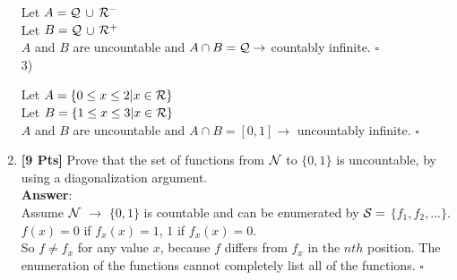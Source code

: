 \documentclass[11pt]{article}
\begin{document}
\begin{enumerate}
Let $A = \cal Q$ $\cup$ $\cal R^-$\\
Let $B = \cal Q$ $\cup$ $\cal R^+$\\

$A$ and $B$ are uncountable and $A \cap B = \cal Q \rightarrow$ countably infinite. $\square$ \\

3)

Let $A = \{ 0 \leq x \leq 2 | x \in \cal R \}$\\
Let $B = \{ 1 \leq x \leq 3 | x \in \cal R \}$\\

$A$ and $B$ are uncountable and $A \cap B = [0,1] \rightarrow$ uncountably infinite. $\square$ \\
 
\clearpage
 
\item {\bf [9 Pts]} Prove that the set of functions from $\cal N$ to $\{0,1\}$ is
  uncountable, by using a diagonalization argument.\\
  \textbf{Answer}:\\
  
  Assume $\cal N$ $\rightarrow$ $\{0,1\}$ is countable and can be enumerated by $\cal S =$ $\{f_1, f_2,...\}$.\\
  
  $f(x) = 0$ if $f_x(x) = 1$, $1$ if $f_x(x) = 0$.\\
  
  So $f \neq f_x$ for any value $x$, because $f$ differs from $f_x$ in the $nth$ position. The enumeration of the functions cannot completely list all of the functions. $\square$

\end{enumerate}
\end{document}
